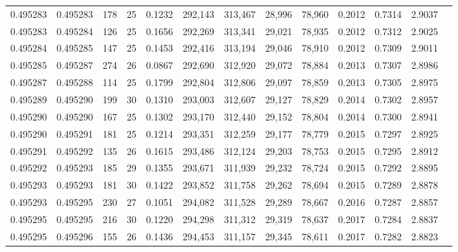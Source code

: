 \begin{tabular}{rrrrrrrrrrrrr}
0.495283 & 0.495283 & 178 &  25 &                                     0.1232 & 292,143 & 313,467 &  28,996 &  78,960 & 0.2012 & 0.7314 & 2.9037 \\
0.495283 & 0.495284 & 126 &  25 &                                     0.1656 & 292,269 & 313,341 &  29,021 &  78,935 & 0.2012 & 0.7312 & 2.9025 \\
0.495284 & 0.495285 & 147 &  25 &                                     0.1453 & 292,416 & 313,194 &  29,046 &  78,910 & 0.2012 & 0.7309 & 2.9011 \\
0.495285 & 0.495287 & 274 &  26 &                                     0.0867 & 292,690 & 312,920 &  29,072 &  78,884 & 0.2013 & 0.7307 & 2.8986 \\
0.495287 & 0.495288 & 114 &  25 &                                     0.1799 & 292,804 & 312,806 &  29,097 &  78,859 & 0.2013 & 0.7305 & 2.8975 \\
0.495289 & 0.495290 & 199 &  30 &                                     0.1310 & 293,003 & 312,607 &  29,127 &  78,829 & 0.2014 & 0.7302 & 2.8957 \\
0.495290 & 0.495290 & 167 &  25 &                                     0.1302 & 293,170 & 312,440 &  29,152 &  78,804 & 0.2014 & 0.7300 & 2.8941 \\
0.495290 & 0.495291 & 181 &  25 &                                     0.1214 & 293,351 & 312,259 &  29,177 &  78,779 & 0.2015 & 0.7297 & 2.8925 \\
0.495291 & 0.495292 & 135 &  26 &                                     0.1615 & 293,486 & 312,124 &  29,203 &  78,753 & 0.2015 & 0.7295 & 2.8912 \\
0.495292 & 0.495293 & 185 &  29 &                                     0.1355 & 293,671 & 311,939 &  29,232 &  78,724 & 0.2015 & 0.7292 & 2.8895 \\
0.495293 & 0.495293 & 181 &  30 &                                     0.1422 & 293,852 & 311,758 &  29,262 &  78,694 & 0.2015 & 0.7289 & 2.8878 \\
0.495293 & 0.495295 & 230 &  27 &                                     0.1051 & 294,082 & 311,528 &  29,289 &  78,667 & 0.2016 & 0.7287 & 2.8857 \\
0.495295 & 0.495295 & 216 &  30 &                                     0.1220 & 294,298 & 311,312 &  29,319 &  78,637 & 0.2017 & 0.7284 & 2.8837 \\
0.495295 & 0.495296 & 155 &  26 &                                     0.1436 & 294,453 & 311,157 &  29,345 &  78,611 & 0.2017 & 0.7282 & 2.8823 \\

\end{tabular}

